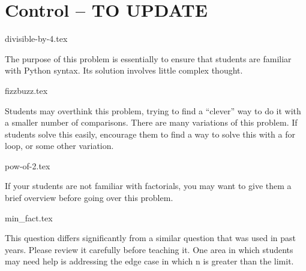 \documentclass{exam}
\begin{document}
\section{Control -- TO UPDATE}
\begin{questions}
{divisible-by-4.tex}
\begin{questionmeta}
  The purpose of this problem is essentially to ensure that students are familiar with Python syntax. Its solution involves little complex thought. 
\end{questionmeta}
{fizzbuzz.tex} 
\begin{questionmeta}
  Students may overthink this problem, trying to find a ``clever'' way to do it with a smaller number of comparisons.
  There are many variations of this problem. If students solve this easily, encourage them to find a way to solve this with a for loop, or some other variation.
\end{questionmeta}
{pow-of-2.tex}
\begin{questionmeta}
  If your students are not familiar with factorials, you may want to give them a brief overview before going over this problem. 
\end{questionmeta}
{min_fact.tex}
\begin{questionmeta}
  This question differs significantly from a similar question that was used in past years. Please review it carefully before teaching it.
  One area in which students may need help is addressing the edge case in which n is greater than the limit.
\end{questionmeta}
\end{questions}
\end{document}
